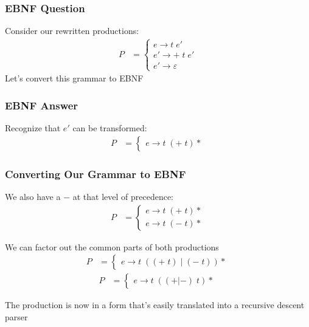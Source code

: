 \documentclass[aspectratio=169]{beamer}
\begin{document}
\begin{frame}
\frametitle{EBNF Question}

Consider our rewritten productions:
\begin{align*}
P &= \begin{cases}e \rightarrow t \; e'\\
  e' \rightarrow + \; t \; e'\\
  e' \rightarrow \varepsilon \text{} \end{cases}
\end{align*}
Let's convert this grammar to EBNF
\end{frame}

\begin{frame}
\frametitle{EBNF Answer}

Recognize that $e'$ can be transformed:
\begin{align*}
P &= \begin{cases}e \rightarrow t \; (+ \; t)*\end{cases}
\end{align*}
\end{frame}

\begin{frame}
\frametitle{Converting Our Grammar to EBNF}

We also have a $-$ at that level of precedence:
\begin{align*}
P &= \begin{cases}e \rightarrow t \; (+ \; t)*\\
     e \rightarrow t \; (- \; t)*\end{cases}
\end{align*}

We can factor out the common parts of both productions
\begin{align*}
P &= \begin{cases}e \rightarrow t \; ((+ \; t) \; | \; (- \; t))*\end{cases}
\end{align*}
\begin{align*}
P &= \begin{cases}e \rightarrow t \; ((+|-) \; t)*\end{cases}
\end{align*}

The production is now in a form that's easily translated into a recursive
descent parser
\end{frame}
\end{document}
